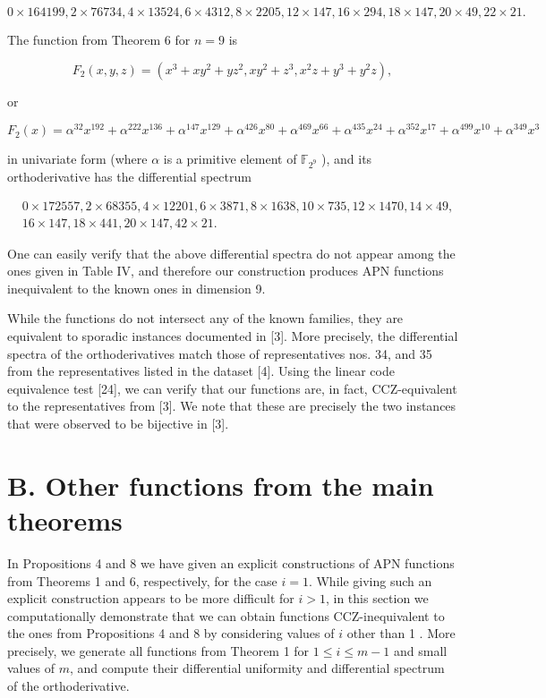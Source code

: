 \documentclass[10pt]{article}
\begin{document}
$$
0 \times 164199,2 \times 76734,4 \times 13524,6 \times 4312,8 \times 2205,12 \times 147,16 \times 294,18 \times 147,20 \times 49,22 \times 21 \text {. }
$$

The function from Theorem 6 for $n=9$ is

$$
F_{2}(x, y, z)=\left(x^{3}+x y^{2}+y z^{2}, x y^{2}+z^{3}, x^{2} z+y^{3}+y^{2} z\right),
$$

or

$$
F_{2}(x)=\alpha^{32} x^{192}+\alpha^{222} x^{136}+\alpha^{147} x^{129}+\alpha^{426} x^{80}+\alpha^{469} x^{66}+\alpha^{435} x^{24}+\alpha^{352} x^{17}+\alpha^{499} x^{10}+\alpha^{349} x^{3}
$$

in univariate form (where $\alpha$ is a primitive element of $\mathbb{F}_{2^{9}}$ ), and its orthoderivative has the differential spectrum

$$
\begin{aligned}
& 0 \times 172557,2 \times 68355,4 \times 12201,6 \times 3871,8 \times 1638,10 \times 735,12 \times 1470,14 \times 49, \\
& 16 \times 147,18 \times 441,20 \times 147,42 \times 21 .
\end{aligned}
$$

One can easily verify that the above differential spectra do not appear among the ones given in Table IV, and therefore our construction produces APN functions inequivalent to the known ones in dimension 9.

While the functions do not intersect any of the known families, they are equivalent to sporadic instances documented in [3]. More precisely, the differential spectra of the orthoderivatives match those of representatives nos. 34, and 35 from the representatives listed in the dataset [4]. Using the linear code equivalence test [24], we can verify that our functions are, in fact, CCZ-equivalent to the representatives from [3]. We note that these are precisely the two instances that were observed to be bijective in [3].

\section*{B. Other functions from the main theorems}
In Propositions 4 and 8 we have given an explicit constructions of APN functions from Theorems 1 and 6, respectively, for the case $i=1$. While giving such an explicit construction appears to be more difficult for $i>1$, in this section we computationally demonstrate that we can obtain functions CCZ-inequivalent to the ones from Propositions 4 and 8 by considering values of $i$ other than 1 . More precisely, we generate all functions from Theorem 1 for $1 \leq i \leq m-1$ and small values of $m$, and compute their differential uniformity and differential spectrum of the orthoderivative.
\end{document}
